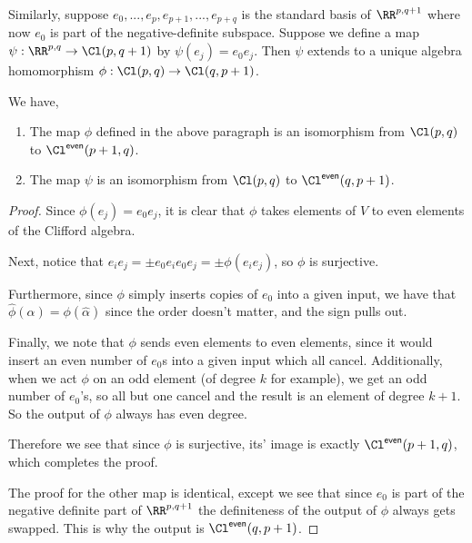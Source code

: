 Similarly, suppose $e_0,...,e_p,e_{p+1},...,e_{p+q}$ is the standard basis of $\RR^{p,q+1}$ where now $e_0$ is part of the negative-definite subspace. Suppose we define a map $\psi : \RR^{p,q} \to \Cl(p,q+1)$ by $\psi(e_j) = e_0 e_j$. Then $\psi$ extends to a unique algebra homomorphism $\phi : \Cl(p,q) \to \Cl(q,p+1)$.
\begin{thm}
We have,
\begin{enumerate}
    \item The map $\phi$ defined in the above paragraph is an isomorphism from $\Cl(p,q)$ to $\Cl^{\textsf{even}}(p+1,q)$.
    \item The map $\psi$ is an isomorphism from $\Cl(p,q)$ to $\Cl^{\textsf{even}}(q,p+1)$.
\end{enumerate}
\end{thm}
\begin{proof}
    Since $\phi(e_j) = e_0e_j$, it is clear that $\phi$ takes elements of $V$ to even elements of the Clifford algebra. 
    
    Next, notice that $e_ie_j = \pm e_0 e_i e_0 e_j=\pm \phi(e_ie_j)$, so $\phi$ is surjective. 

    Furthermore, since $\phi$ simply inserts copies of $e_0$ into a given input, we have that $\hat{\phi}(\alpha) = \phi(\hat{\alpha})$ since the order doesn't matter, and the sign pulls out.

    Finally, we note that $\phi$ sends even elements to even elements, since it would insert an even number of $e_0$s into a given input which all cancel. Additionally, when we act $\phi$ on an odd element (of degree $k$ for example), we get an odd number of $e_0$'s, so all but one cancel and the result is an element of degree $k+1$. So the output of $\phi$ always has even degree.

    Therefore we see that since $\phi$ is surjective, its' image is exactly $\Cl^{\textsf{even}}(p+1,q)$, which completes the proof.

    The proof for the other map is identical, except we see that since $e_0$ is part of the negative definite part of $\RR^{p,q+1}$ the definiteness of the output of $\phi$ always gets swapped. This is why the output is $\Cl^{\textsf{even}}(q,p+1)$.
\end{proof}
